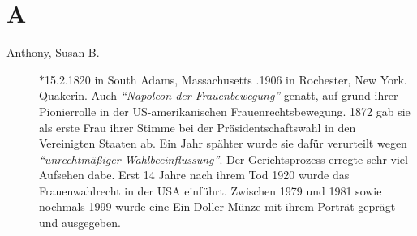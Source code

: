 \section*{A}

\articlesize
\begin{description}


 \item[Anthony, Susan B.] $\ast$15.2.1820 in South Adams, Massachusetts
.1906 in Rochester, New York. Quakerin. Auch \textit{"`Napoleon der
Frauenbewegung"'} genatt, auf grund ihrer Pionierrolle in der US-amerikanischen
Frauenrechtsbewegung. 1872 gab sie als erste Frau ihrer Stimme bei der
Präsidentschaftswahl in den Vereinigten Staaten ab. Ein Jahr spähter wurde sie
dafür verurteilt wegen \textit{"`unrechtmäßiger Wahlbeeinflussung"'}. Der
Gerichtsprozess erregte sehr viel Aufsehen dabe. Erst 14 Jahre nach ihrem Tod
1920 wurde das Frauenwahlrecht in der USA einführt. Zwischen 1979 und 1981 sowie
nochmals 1999 wurde eine Ein-Doller-Münze mit ihrem Porträt geprägt und
ausgegeben.

 \end{description}
\normalsize

